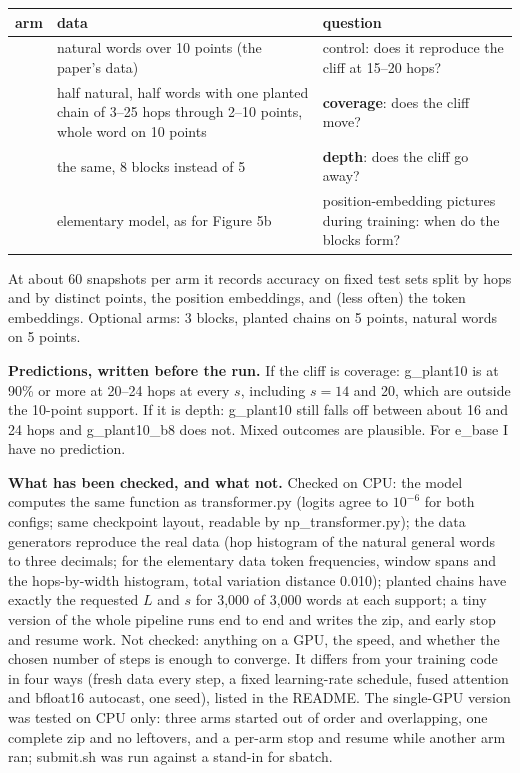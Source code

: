 \documentclass[paper=a4,fontsize=11pt,DIV=11,parskip=half,headings=small,numbers=noendperiod]{scrartcl}
\DeclareRobustCommand{\lead}[1]{\textsf{\bfseries\color{accent}#1}}
\DeclareRobustCommand{\code}[1]{{\fontseries{m}\ttfamily #1}}
\DeclareRobustCommand{\hdr}[1]{\textsf{\bfseries #1}}
\begin{document}
\begin{center}\small
\begin{tabular}{@{}>{\raggedright\arraybackslash}p{2.9cm} >{\raggedright\arraybackslash}p{5.8cm}
>{\raggedright\arraybackslash}p{5.2cm}@{}}
\toprule
\hdr{arm} & \hdr{data} & \hdr{question} \\
\midrule
\code{g\_\allowbreak{}m10} & natural words over 10 points (the paper’s data) & control: does it reproduce the cliff at 15–20 hops? \\
\code{g\_\allowbreak{}plant10} & half natural, half words with one planted chain of 3–25 hops through 2–10 points, whole word on 10 points & \textbf{coverage}: does the cliff move? \\
\code{g\_\allowbreak{}plant10\_\allowbreak{}b8} & the same, 8 blocks instead of 5 & \textbf{depth}: does the cliff go away? \\
\code{e\_\allowbreak{}base} & elementary model, as for Figure 5b & position-embedding pictures during training: when do the blocks form? \\
\bottomrule
\end{tabular}
\end{center}

At about 60 snapshots per arm it records accuracy on fixed test sets split by hops and by distinct points, the
position embeddings, and (less often) the token embeddings. Optional arms: 3 blocks, planted chains on 5 points,
natural words on 5 points.

\lead{Predictions, written before the run.} If the cliff is coverage: \code{g\_\allowbreak{}plant10} is at 90\%
or more at 20–24 hops at every $s$, including $s=14$ and 20, which are outside the 10-point support. If it is
depth: \code{g\_\allowbreak{}plant10} still falls off between about 16 and 24 hops and
\code{g\_\allowbreak{}plant10\_\allowbreak{}b8} does not. Mixed outcomes are plausible. For
\code{e\_\allowbreak{}base} I have no prediction.

\lead{What has been checked, and what not.} Checked on CPU: the model computes the same function as
\code{transformer.\allowbreak{}py} (logits agree to $10^{-6}$ for both configs; same checkpoint layout, readable
by \code{np\_\allowbreak{}transformer.\allowbreak{}py}); the data generators reproduce the real data (hop
histogram of the natural general words to three decimals; for the elementary data token frequencies, window
spans and the hops-by-width histogram, total variation distance 0.010); planted chains have exactly the
requested $L$ and $s$ for 3,000 of 3,000 words at each support; a tiny version of the whole pipeline runs end to
end and writes the zip, and early stop and resume work. Not checked: anything on a GPU, the speed, and whether
the chosen number of steps is enough to converge. It differs from your training code in four ways (fresh data
every step, a fixed learning-rate schedule, fused attention and bfloat16 autocast, one seed), listed in the
README. The single-GPU version was tested on CPU only: three arms started out of order and overlapping, one
complete zip and no leftovers, and a per-arm stop and resume while another arm ran;
\code{submit.\allowbreak{}sh} was run against a stand-in for \code{sbatch}.
\end{document}
